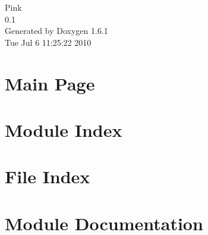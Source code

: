 \documentclass[a4paper]{book}
\begin{document}
\begin{titlepage}
\vspace*{7cm}
\begin{center}
{\Large Pink \\[1ex]\large 0.1 }\\
\vspace*{1cm}
{\large Generated by Doxygen 1.6.1}\\
\vspace*{0.5cm}
{\small Tue Jul 6 11:25:22 2010}\\
\end{center}
\end{titlepage}
\clearemptydoublepage
{}
\tableofcontents
\clearemptydoublepage
{}
\chapter{Main Page}
\label{index}
\chapter{Module Index}

\chapter{File Index}

\chapter{Module Documentation}














\end{document}
